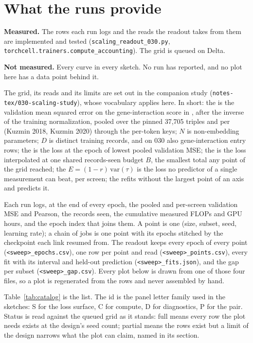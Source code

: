 
\section{What the runs provide}
\label{sec:inputs}

\begin{keybox}
\textbf{Measured.} The rows each run logs and the reads the readout takes from
them are implemented and tested (\texttt{scaling\_readout\_030.py},
\texttt{torchcell.trainers.compute\_accounting}). The grid is queued on Delta.

\textbf{Not measured.} Every curve in every sketch. No run has reported, and no
plot here has a data point behind it.
\end{keybox}

The grid, its reads and its limits are set out in the companion study
(\texttt{notes-tex/030-scaling-study}), whose vocabulary applies here. In short:
the  is the validation mean squared error on the gene-interaction
score in , after the inverse of the training normalization,
pooled over the pinned 37,705 triples and per  (Kuzmin 2018,
Kuzmin 2020) through the per-token keys; $N$ is non-embedding parameters; $D$
is distinct training records, and on 030 also gene-interaction entry rows; the
 is the loss at the epoch of lowest pooled validation MSE;
the  is the loss interpolated at one shared records-seen
budget $B$, the smallest total any point of the grid reached; the
 $E = (1 - r)\,\mathrm{var}(\tau)$ is the loss no predictor
of a single measurement can beat, per screen; the  refits
without the largest point of an axis and predicts it.

Each run logs, at the end of every epoch, the pooled and per-screen validation
MSE and Pearson, the records seen, the cumulative measured FLOPs and GPU hours,
and the epoch index that joins them. A point is one (size, subset, seed, learning
rate); a chain of jobs is one point with its epochs stitched by the checkpoint
each link resumed from. The readout keeps every epoch of every point
(\texttt{<sweep>\_epochs.csv}), one row per point and read
(\texttt{<sweep>\_points.csv}), every fit with its interval and held-out
prediction (\texttt{<sweep>\_fits.json}), and the gap per subset
(\texttt{<sweep>\_gap.csv}). Every plot below is drawn from one of those four
files, so a plot is regenerated from the rows and never assembled by hand.

Table~\ref{tab:catalog} is the list. The id is the panel letter family used in
the sketches: S for the loss surface, C for compute, D for diagnostics, P for the
pair. Status is read against the queued grid as it stands: full means every row
the plot needs exists at the design's seed count; partial means the rows exist
but a limit of the design narrows what the plot can claim, named in its section.


